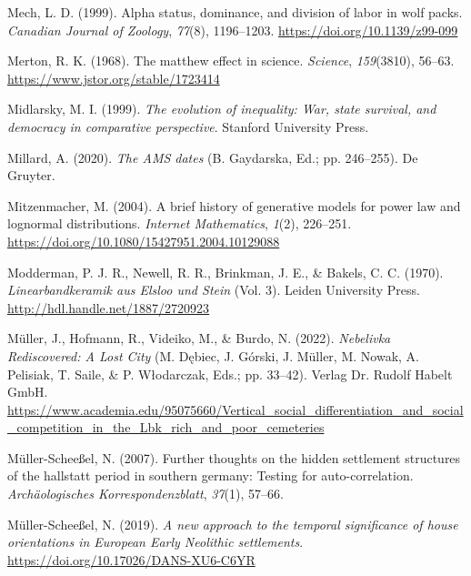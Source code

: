\documentclass[
  12pt,
]{book}
\newlength{\cslhangindent}
\newlength{\cslentryspacingunit} %
\newenvironment{CSLReferences}[2] %
 {%
  \setlength{\parindent}{0pt}
  \ifodd #1
  \let\oldpar\par
  \def\par{\hangindent=\cslhangindent\oldpar}
  \fi
  \setlength{\parskip}{#2\cslentryspacingunit}
 }%
 {}
\begin{document}
\begin{CSLReferences}{1}{0}
\leavevmode{}%
Mech, L. D. (1999). Alpha status, dominance, and division of labor in wolf packs. \emph{Canadian Journal of Zoology}, \emph{77}(8), 1196--1203. \url{https://doi.org/10.1139/z99-099}

\leavevmode{}%
Merton, R. K. (1968). The matthew effect in science. \emph{Science}, \emph{159}(3810), 56--63. \url{https://www.jstor.org/stable/1723414}

\leavevmode{}%
Midlarsky, M. I. (1999). \emph{The evolution of inequality: War, state survival, and democracy in comparative perspective}. Stanford University Press.

\leavevmode{}%
Millard, A. (2020). \emph{The AMS dates} (B. Gaydarska, Ed.; pp. 246--255). De Gruyter.

\leavevmode{}%
Mitzenmacher, M. (2004). A brief history of generative models for power law and lognormal distributions. \emph{Internet Mathematics}, \emph{1}(2), 226--251. \url{https://doi.org/10.1080/15427951.2004.10129088}

\leavevmode{}%
Modderman, P. J. R., Newell, R. R., Brinkman, J. E., \& Bakels, C. C. (1970). \emph{Linearbandkeramik aus Elsloo und Stein} (Vol. 3). Leiden University Press. \url{http://hdl.handle.net/1887/2720923}

\leavevmode{}%
Müller, J., Hofmann, R., Videiko, M., \& Burdo, N. (2022). \emph{Nebelivka {\textendash} Rediscovered: A Lost City} (M. Dębiec, J. Górski, J. Müller, M. Nowak, A. Pelisiak, T. Saile, \& P. Włodarczak, Eds.; pp. 33--42). Verlag Dr. Rudolf Habelt GmbH. \url{https://www.academia.edu/95075660/Vertical_social_differentiation_and_social_competition_in_the_Lbk_rich_and_poor_cemeteries}

\leavevmode{}%
Müller-Scheeßel, N. (2007). Further thoughts on the hidden settlement structures of the hallstatt period in southern germany: Testing for auto-correlation. \emph{Archäologisches Korrespondenzblatt}, \emph{37}(1), 57--66.

\leavevmode{}%
Müller-Scheeßel, N. (2019). \emph{A new approach to the temporal significance of house orientations in European Early Neolithic settlements}. \url{https://doi.org/10.17026/DANS-XU6-C6YR}


\end{CSLReferences}
\end{document}
